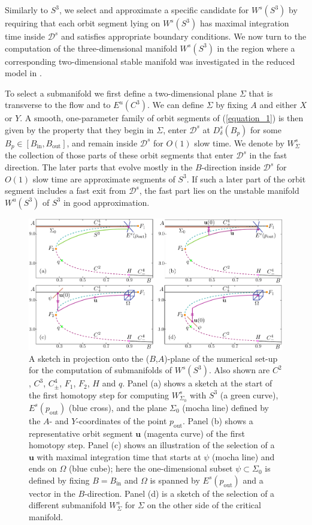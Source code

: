 \documentclass{ws-ijbc}
\begin{document}
Similarly to $S^3$, we select and approximate a specific candidate for $W^{s}(S^3)$ by requiring that each orbit segment lying on $W^{s}(S^3)$ has maximal integration time inside $\mathscr{D}^s$ and satisfies appropriate boundary conditions.  We now turn to the computation of the three-dimensional manifold $W^{s}(S^3)$ in the region where a corresponding two-dimensional stable manifold was investigated in the reduced model in \cite{QSSA}.

To select a submanifold we first define a two-dimensional plane $\Sigma$ that is transverse to the flow and to $E^u(C^3)$.  We can define $\Sigma$ by fixing $A$ and either $X$ or $Y$.  A smooth, one-parameter family of orbit segments of (\ref{equation_1}) is then given by the property that they begin in $\Sigma$, enter $\mathscr{D}^s$ at $D^s_{\delta}(B_p)$ for some $B_p \in [B_{\text{in}}, B_{\text{out}}]$, and remain inside $\mathscr{D}^s$ for $O(1)$ slow time.  We denote by $W^{s}_{\Sigma}$ the collection of those parts of these orbit segments that enter $\mathscr{D}^s$ in the fast direction.  The later parts that evolve mostly in the $B$-direction inside $\mathscr{D}^s$ for $O(1)$ slow time are approximate segments of $S^3$.  If such a later part of the orbit segment includes a fast exit from $\mathscr{D}^s$, the fast part lies on the unstable manifold $W^{u}(S^3)$ of $S^3$ in good approximation.

\begin{figure}[h]
\centering
\includegraphics[]{./figures/MKMO_3.pdf}
\caption{A sketch in projection onto the ($B$,$A$)-plane of the numerical set-up for the computation of submanifolds of $W^s(S^3)$.  Also shown are $C^2$, $C^3$, $C^4_\pm$, $F_1$, $F_2$, $H$ and $q$.  Panel (a) shows a sketch at the start of the first homotopy step for computing $W^{s}_{\Sigma_0}$ with $S^3$ (a green curve), $E^s(p_{\text{out}})$ (blue cross), and the plane $\Sigma_0$ (mocha line) defined by the $A$- and $Y$-coordinates of the point $p_{\text{out}}$.  Panel (b) shows a representative orbit segment $\mathbf{u}$ (magenta curve) of the first homotopy step.  Panel (c) shows an illustration of the selection of a $\mathbf{u}$ with maximal integration time that starts at $\psi$ (mocha line) and ends on $\Omega$ (blue cube); here the one-dimensional subset $\psi \subset \Sigma_0$ is defined by fixing $B = B_{\text{in}}$ and $\Omega$ is spanned by $E^s(p_{\text{out}})$ and a vector in the $B$-direction. Panel (d) is a sketch of the selection of a different submanifold $W^{s}_{\Sigma}$ for $\Sigma$ on the other side of the critical manifold.}
\label{figure_3}
\end{figure}
\end{document}
